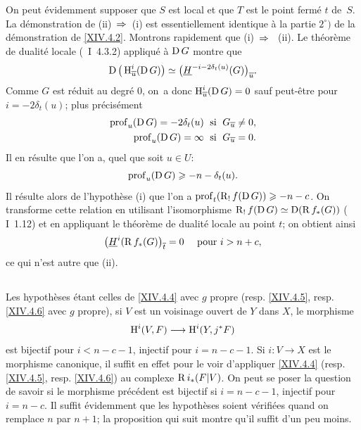 On peut \'evidemment supposer que $S$ est local et que $T$ est le point ferm\'e $t$ de~$S$. La d\'emonstration de \textup{(ii)}~$\To$~\textup{(i)} est essentiellement identique \`a la partie $2^\circ)$ de la d\'emonstration de \ref{XIV.4.2}. Montrons rapidement que \textup{(i)}~$\To$~ \textup{(ii)}. Le th\'eor\`eme de dualit\'e locale (~I~4.3.2) appliqu\'e \`a $\operatorname{D} G$ montre que
$$
\operatorname{D}\big(\operatorname{H}_{\overline{u}}^{i}(\operatorname{D} G)\big) \simeq\big(\underline{H}^{-i-2\delta_{t}(u)}(G)\big)_{\overline{u}}.
$$
Comme $G$ est r\'eduit au degr\'e $0$, on~a donc $\operatorname{H}_{\overline{u}}^{i}(\operatorname{D} G)=0$ sauf peut-\^etre pour $i=-2\delta_{t}(u)$; plus pr\'ecis\'ement
\begin{align*}
\operatorname{prof}_{u}(\operatorname{D} G)=-2\delta_{t}(u) &\;\textrm{ si }\; G_{\overline{u}}\neq 0, \\
\operatorname{prof}_{u}(\operatorname{D} G)=\infty &\;\textrm{ si }\; G_{\overline{u}}=0.
\end{align*}
Il en r\'esulte que l'on a, quel que soit $u\in U$:
$$
\operatorname{prof}_{u}(\operatorname{D} G)\geqslant -n-\delta_{t}(u).
$$
Il r\'esulte alors de l'hypoth\`ese \textup{(i)} que l'on a $\operatorname{prof}_{t}(\operatorname{R}_{!}f(\operatorname{D} G))\geqslant -n-c$. On transforme cette relation en utilisant l'isomorphisme $\operatorname{R}_{!}f(\operatorname{D} G)\simeq\operatorname{D}(\operatorname{R} f_{\ast}(G))$ ( I~1.12) et en appliquant le th\'eor\`eme de dualit\'e locale au point $t$; on obtient ainsi
$$
\big(\underline{H}^{i}(\operatorname{R} f_{\ast}(G)\big)_{\overline{t}}=0\quad\textrm{ pour }i>n+c,
$$
ce qui n'est autre que \textup{(ii)}.

\subsection{} \label{XIV.4.8} Les hypoth\`eses \'etant celles de \ref{XIV.4.4} avec $g$ propre (resp. \ref{XIV.4.5}, resp. \ref{XIV.4.6} avec $g$ propre), si $V$ est un voisinage ouvert de $Y$ dans $X$, le morphisme
$$
\H^{i}(V, F)\to\H^{i}(Y, j^{\ast}F)$$
est bijectif pour $i<n-c-1$, injectif pour $i=n-c-1$. Si $i\colon V\to X$ est le morphisme canonique, il suffit en effet pour le voir d'appliquer \ref{XIV.4.4} (resp. \ref{XIV.4.5}, resp. \ref{XIV.4.6}) au complexe $\operatorname{R} i_{\ast}(F{|V})$. On peut se poser la question de savoir si le morphisme pr\'ec\'edent est bijectif si $i=n-c-1$, injectif pour $i=n-c$. Il suffit \'evidemment que les hypoth\`eses soient v\'erifi\'ees quand on remplace $n$ par $n+1$; la proposition qui suit montre qu'il suffit d'un peu moins.


